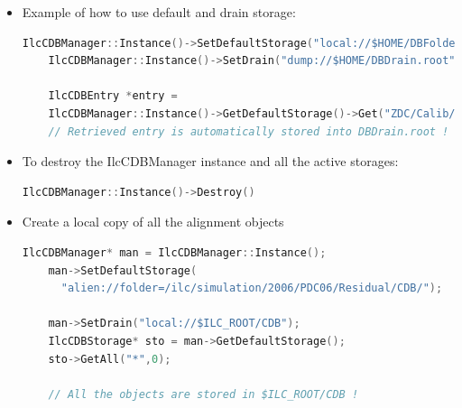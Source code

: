 \documentclass[12pt,a4paper,twoside]{article}
\begin{document}
{\begin{itemize}
  The drain storage can be set in a similar way:

  \begin{lstlisting}[language=C++]
    IlcCDBManager::Instance()->SetDrain("uri")
  \end{lstlisting}

  There are some IlcCDBManager public methods to handle the default and 
  storage methods:

  \begin{lstlisting}[language=C++]
    Bool_t 	IsDefaultStorageSet()
    void	RemoveDefaultStorage()
    Bool_t 	IsDrainSet()
    void	RemoveDrain()
  \end{lstlisting}

\item Example of how to use default and drain storage:

  \begin{lstlisting}[language=C++]
    IlcCDBManager::Instance()->SetDefaultStorage("local://$HOME/DBFolder");
    IlcCDBManager::Instance()->SetDrain("dump://$HOME/DBDrain.root");

    IlcCDBEntry *entry = 
    IlcCDBManager::Instance()->GetDefaultStorage()->Get("ZDC/Calib/Pedestals",5)
    // Retrieved entry is automatically stored into DBDrain.root !
  \end{lstlisting}

\item To destroy the IlcCDBManager instance and all the active storages:

  \begin{lstlisting}[language=C++]
    IlcCDBManager::Instance()->Destroy()
  \end{lstlisting}

 \item Create a local copy of all the alignment objects

  \begin{lstlisting}[language=C++]
    IlcCDBManager* man = IlcCDBManager::Instance();
    man->SetDefaultStorage(
      "alien://folder=/ilc/simulation/2006/PDC06/Residual/CDB/");

    man->SetDrain("local://$ILC_ROOT/CDB");
    IlcCDBStorage* sto = man->GetDefaultStorage();
    sto->GetAll("*",0);

    // All the objects are stored in $ILC_ROOT/CDB !
  \end{lstlisting}

\end{itemize}

\newpage
}
\end{document}
